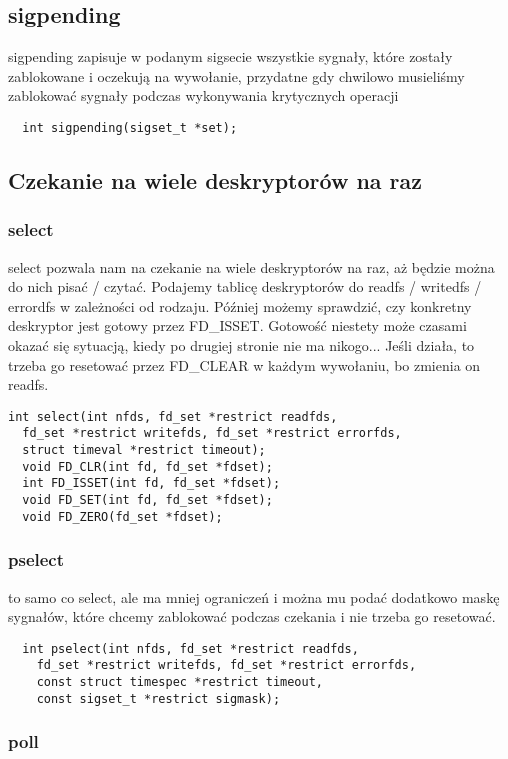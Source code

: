 \documentclass[12pt, a4paper, polish, openany]{book}
\begin{document}
\subsection{sigpending}
sigpending zapisuje w podanym sigsecie wszystkie sygnały, które zostały zablokowane i oczekują na wywołanie, przydatne gdy chwilowo musieliśmy zablokować sygnały podczas wykonywania krytycznych operacji
\begin{verbatim}
  int sigpending(sigset_t *set);
\end{verbatim}
\subsection{Czekanie na wiele deskryptorów na raz}
\subsubsection{select}
select pozwala nam na czekanie na wiele deskryptorów na raz, aż będzie można do nich pisać / czytać. Podajemy tablicę deskryptorów do readfs / writedfs / errordfs w zależności od rodzaju. Później możemy sprawdzić, czy konkretny deskryptor jest gotowy przez FD\_ISSET. Gotowość niestety może czasami okazać się sytuacją, kiedy po drugiej stronie nie ma nikogo... Jeśli działa, to trzeba go resetować przez FD\_CLEAR w każdym wywołaniu, bo zmienia on readfs. 
\begin{verbatim}
int select(int nfds, fd_set *restrict readfds,
  fd_set *restrict writefds, fd_set *restrict errorfds,
  struct timeval *restrict timeout);
  void FD_CLR(int fd, fd_set *fdset);
  int FD_ISSET(int fd, fd_set *fdset);
  void FD_SET(int fd, fd_set *fdset);
  void FD_ZERO(fd_set *fdset);
\end{verbatim}
\subsubsection{pselect}
to samo co select, ale ma mniej ograniczeń i można mu podać dodatkowo maskę sygnałów, które chcemy zablokować podczas czekania i nie trzeba go resetować.
\begin{verbatim}
  int pselect(int nfds, fd_set *restrict readfds,
    fd_set *restrict writefds, fd_set *restrict errorfds,
    const struct timespec *restrict timeout,
    const sigset_t *restrict sigmask);
\end{verbatim}
\subsubsection{poll}
\newpage
\end{document}
